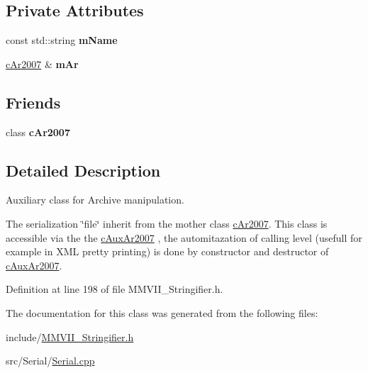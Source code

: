 \subsection*{Private Attributes}
\begin{DoxyCompactItemize}
\item 
const std\+::string {\bfseries m\+Name}\hypertarget{classMMVII_1_1cAuxAr2007_a4ae710fe6863365b9faff0662e28366c}{}\label{classMMVII_1_1cAuxAr2007_a4ae710fe6863365b9faff0662e28366c}

\item 
\hyperlink{classMMVII_1_1cAr2007}{c\+Ar2007} \& {\bfseries m\+Ar}\hypertarget{classMMVII_1_1cAuxAr2007_a82d7185afd784908d8d9da894a990f30}{}\label{classMMVII_1_1cAuxAr2007_a82d7185afd784908d8d9da894a990f30}

\end{DoxyCompactItemize}
\subsection*{Friends}
\begin{DoxyCompactItemize}
\item 
class {\bfseries c\+Ar2007}\hypertarget{classMMVII_1_1cAuxAr2007_a8de4cc629f2fffb4afea4b7f9dd4de3e}{}\label{classMMVII_1_1cAuxAr2007_a8de4cc629f2fffb4afea4b7f9dd4de3e}

\end{DoxyCompactItemize}


\subsection{Detailed Description}
Auxiliary class for Archive manipulation. 

The serialization \char`\"{}file\char`\"{} inherit from the mother class \hyperlink{classMMVII_1_1cAr2007}{c\+Ar2007}. This class is accessible via the the \hyperlink{classMMVII_1_1cAuxAr2007}{c\+Aux\+Ar2007} , the automitazation of calling level (usefull for example in X\+ML pretty printing) is done by constructor and destructor of \hyperlink{classMMVII_1_1cAuxAr2007}{c\+Aux\+Ar2007}. 

Definition at line 198 of file M\+M\+V\+I\+I\+\_\+\+Stringifier.\+h.



The documentation for this class was generated from the following files\+:\begin{DoxyCompactItemize}
\item 
include/\hyperlink{MMVII__Stringifier_8h}{M\+M\+V\+I\+I\+\_\+\+Stringifier.\+h}\item 
src/\+Serial/\hyperlink{Serial_8cpp}{Serial.\+cpp}\end{DoxyCompactItemize}
